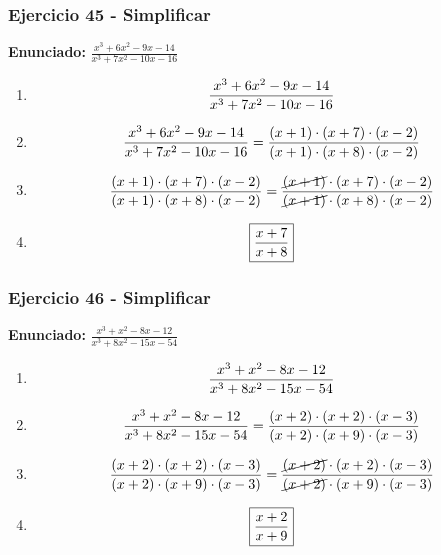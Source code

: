 \documentclass[11pt,a4paper]{article}
\newcommand{\fitmath}[1]{%
\[
\setbox0=\hbox{$\displaystyle #1$}%
\ifdim\wd0>\linewidth
\resizebox{\linewidth}{!}{$\displaystyle #1$}%
\else
#1%
\fi
\]
}
\begin{document}
\vspace{0.12cm}
\subsubsection*{Ejercicio 45 - Simplificar}
\textbf{Enunciado:} $ \frac{x^{3} + 6 x^{2} - 9 x - 14}{x^{3} + 7 x^{2} - 10 x - 16} $\par
\begin{enumerate}[leftmargin=2em]
\item \fitmath{\frac{x^{3} + 6 x^{2} - 9 x - 14}{x^{3} + 7 x^{2} - 10 x - 16}}
\item \fitmath{\frac{x^{3} + 6 x^{2} - 9 x - 14}{x^{3} + 7 x^{2} - 10 x - 16}=\frac{\left(x + 1\right)\cdot \left(x + 7\right)\cdot \left(x - 2\right)}{\left(x + 1\right)\cdot \left(x + 8\right)\cdot \left(x - 2\right)}}
\item \fitmath{\frac{\left(x + 1\right)\cdot \left(x + 7\right)\cdot \left(x - 2\right)}{\left(x + 1\right)\cdot \left(x + 8\right)\cdot \left(x - 2\right)}=\frac{\cancel{\left(x + 1\right)}\cdot \left(x + 7\right)\cdot \left(x - 2\right)}{\cancel{\left(x + 1\right)}\cdot \left(x + 8\right)\cdot \left(x - 2\right)}}
\item \fitmath{\boxed{\frac{x + 7}{x + 8}}}
\end{enumerate}

\vspace{0.12cm}
\subsubsection*{Ejercicio 46 - Simplificar}
\textbf{Enunciado:} $ \frac{x^{3} + x^{2} - 8 x - 12}{x^{3} + 8 x^{2} - 15 x - 54} $\par
\begin{enumerate}[leftmargin=2em]
\item \fitmath{\frac{x^{3} + x^{2} - 8 x - 12}{x^{3} + 8 x^{2} - 15 x - 54}}
\item \fitmath{\frac{x^{3} + x^{2} - 8 x - 12}{x^{3} + 8 x^{2} - 15 x - 54}=\frac{\left(x + 2\right)\cdot \left(x + 2\right)\cdot \left(x - 3\right)}{\left(x + 2\right)\cdot \left(x + 9\right)\cdot \left(x - 3\right)}}
\item \fitmath{\frac{\left(x + 2\right)\cdot \left(x + 2\right)\cdot \left(x - 3\right)}{\left(x + 2\right)\cdot \left(x + 9\right)\cdot \left(x - 3\right)}=\frac{\cancel{\left(x + 2\right)}\cdot \left(x + 2\right)\cdot \left(x - 3\right)}{\cancel{\left(x + 2\right)}\cdot \left(x + 9\right)\cdot \left(x - 3\right)}}
\item \fitmath{\boxed{\frac{x + 2}{x + 9}}}
\end{enumerate}
\end{document}
